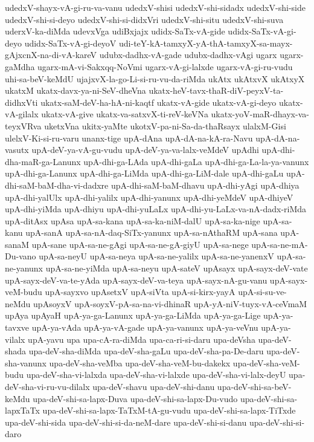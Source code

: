 {udedxV-shayx-vA-gi-ru-va-vanu
udedxV-shisi
udedxV-shi-sidadx
udedxV-shi-side
udedxV-shi-si-deyo
udedxV-shi-si-didxVri
udedxV-shi-situ
udedxV-shi-suva
uderxV-ka-diMda
udevxVga
udiBxjajx
udidx-SaTx-vA-gide
udidx-SaTx-vA-gi-deyo
udidx-SaTx-vA-gi-deyoV
udi-teY-kA-tamxyX-yA-thA-tamxyX-sa-mayx-gAjxcnX-na-di-vA-kareV
udubx-dadhx-vA-gade
udubx-dadhx-vAgi
ugarx
ugarx-gaMdha
ugarx-mA-vi-Sakxqq-NoVmi
ugarx-vA-gi-lalxde
ugarx-vA-gi-ru-vudu
uhi-sa-beV-keMdU
ujajxvX-la-go-Li-si-ru-vu-da-riMda
ukAtx
ukAtxvX
ukAtxyX
ukatxM
ukatx-davx-ya-ni-SeV-dheVna
ukatx-heV-tavx-thaR-diV-peyxV-ta-didhxVti
ukatx-saM-deV-ha-hA-ni-kaqtf
ukatx-vA-gide
ukatx-vA-gi-deyo
ukatx-vA-gilalx
ukatx-vA-give
ukatx-va-satxvX-ti-reV-keVNa
ukatx-yoV-maR-dhayx-va-teyxVRva
uketxVna
ukitx-yaMte
ukotxV-pa-ni-Sa-da-thaRsayx
ulalxM-Gisi
ulelxV-Ki-si-ru-varu
unanx-tige
upA-dAna
upA-dA-na-kA-ra-Navu
upA-dA-na-vasutx
upA-deV-ya-vA-gu-vudu
upA-deV-ya-va-lalx-veMdeV
upAdhi
upA-dhi-dha-maR-ga-Lanunx
upA-dhi-ga-LAda
upA-dhi-gaLa
upA-dhi-ga-La-la-ya-vanunx
upA-dhi-ga-Lanunx
upA-dhi-ga-LiMda
upA-dhi-ga-LiM-dale
upA-dhi-gaLu
upA-dhi-saM-baM-dha-vi-dadxre
upA-dhi-saM-baM-dhavu
upA-dhi-yAgi
upA-dhiya
upA-dhi-yalUlx
upA-dhi-yalilx
upA-dhi-yanunx
upA-dhi-yeMdeV
upA-dhiyeV
upA-dhi-yiMda
upA-dhiyu
upA-dhi-yuLaLx
upA-dhi-yu-LaLx-va-nA-dadx-riMda
upA-ditAsx
upAsa
upA-sa-kana
upA-sa-ka-niM-dalU
upA-sa-ka-nige
upA-sa-kanu
upA-sanA
upA-sa-nA-daq-SiTx-yanunx
upA-sa-nAthaRM
upA-sana
upA-sanaM
upA-sane
upA-sa-ne-gAgi
upA-sa-ne-gA-giyU
upA-sa-nege
upA-sa-ne-mA-Du-vano
upA-sa-neyU
upA-sa-neya
upA-sa-ne-yalilx
upA-sa-ne-yanenxV
upA-sa-ne-yanunx
upA-sa-ne-yiMda
upA-sa-neyu
upA-sateV
upAsayx
upA-sayx-deV-vate
upA-sayx-deV-va-te-yAda
upA-sayx-deV-va-teya
upA-sayx-nA-gu-vanu
upA-sayx-veM-budu
upA-sayxvo
upAsetxV
upA-siVta
upA-si-kirx-yayA
upA-si-su-ve-neMdu
upAsoyxV
upA-soyxV-pA-sa-na-vi-dhinaR
upA-yA-niV-tuyx-vA-ceVmaM
upAya
upAyaH
upA-ya-ga-Lanunx
upA-ya-ga-LiMda
upA-ya-ga-Lige
upA-ya-tavxve
upA-ya-vAda
upA-ya-vA-gade
upA-ya-vanunx
upA-ya-veVnu
upA-ya-vilalx
upA-yavu
upa
upa-cA-ra-diMda
upa-ca-ri-si-daru
upa-deVsha
upa-deV-shada
upa-deV-sha-diMda
upa-deV-sha-gaLu
upa-deV-sha-pa-De-daru
upa-deV-sha-vanunx
upa-deV-sha-veMba
upa-deV-sha-veM-bu-dakekx
upa-deV-sha-veM-budu
upa-deV-sha-vi-lalxda
upa-deV-sha-vi-lalxde
upa-deV-sha-vi-lalx-deyU
upa-deV-sha-vi-ru-vu-dilalx
upa-deV-shavu
upa-deV-shi-danu
upa-deV-shi-sa-beV-keMdu
upa-deV-shi-sa-lapx-Duva
upa-deV-shi-sa-lapx-Du-vudo
upa-deV-shi-sa-lapxTaTx
upa-deV-shi-sa-lapx-TaTxM-tA-gu-vudu
upa-deV-shi-sa-lapx-TiTxde
upa-deV-shi-sida
upa-deV-shi-si-da-neM-dare
upa-deV-shi-si-danu
upa-deV-shi-si-daro
}
